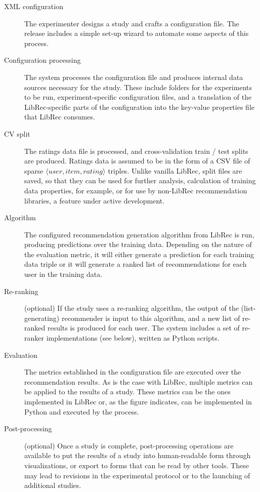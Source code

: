 \begin{description}
\item [XML configuration] The experimenter designs a study and crafts a configuration file. The \libauto{} release includes a simple set-up wizard to automate some aspects of this process.
\item [Configuration processing] The system processes the configuration file and produces internal data sources necessary for the study. These include folders for the experiments to be run, experiment-specific configuration files, and a translation of the LibRec-specific parts of the configuration into the key-value properties file that LibRec consumes.
\item [CV split] The ratings data file is processed, and cross-validation train / test splits are produced. Ratings data is assumed to be in the form of a CSV file of sparse $\langle user, item, rating \rangle$ triples. Unlike vanilla LibRec, split files are saved, so that they can be used for further analysis, calculation of training data properties, for example, or for use by non-LibRec recommendation libraries, a feature under active development.
\item [Algorithm] The configured recommendation generation algorithm from LibRec is run, producing predictions over the training data. Depending on the nature of the evaluation metric, it will either generate a prediction for each training data triple or it will generate a ranked list of recommendations for each user in the training data. 
\item [Re-ranking] (optional) If the study uses a re-ranking algorithm, the output of the (list-generating) recommender is input to this algorithm, and a new list of re-ranked results is produced for each user. The system includes a set of re-ranker implementations (see below), written as Python scripts. 
\item [Evaluation] The metrics established in the configuration file are executed over the recommendation results. As is the case with LibRec, multiple metrics can be applied to the results of a study. These metrics can be the ones implemented in LibRec or, as the figure indicates, can be implemented in Python and executed by the \libauto{} process.
\item [Post-processing] (optional) Once a study is complete, post-processing operations are available to put the results of a study into human-readable form through visualizations, or export to forms that can be read by other tools. These may lead to revisions in the experimental protocol or to the launching of additional studies.
\end{description}

